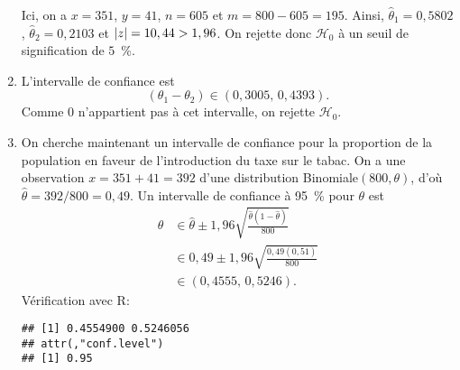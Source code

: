 \begin{solution}{6.10}
\begin{enumerate}
      Ici, on a $x = 351$, $y = 41$, $n = 605$ et $m = 800 - 605 =
      195$. Ainsi, $\hat{\theta}_1 = 0,5802$, $\hat{\theta}_2 =
      0,2103$ et $\lvert z \rvert = 10,44 > 1,96$. On rejette donc $ \mathcal{H}_0$ à un
     seuil de signification de $5$~\%. %
    \item L'intervalle de confiance est
      \begin{displaymath}
        (\theta_1 - \theta_2) \in (0,3005, \, 0,4393).
      \end{displaymath}
      Comme $0$ n'appartient pas à cet intervalle, on rejette $ \mathcal{H}_0$.
    \item On cherche maintenant un intervalle de confiance pour la
      proportion de la population en faveur de l'introduction du taxe
      sur le tabac. On a une observation $x = 351 + 41 = 392$ d'une
      distribution Binomiale$(800, \theta)$, d'où $\hat{\theta} =
      392/800 = 0,49$. Un intervalle de confiance à 95~\% pour
      $\theta$ est
      \begin{align*}
        \theta &\in \hat{\theta} \pm 1,96 \sqrt{\frac{\hat{\theta} (1 -
            \hat{\theta})}{800}} \\
        &\in 0,49 \pm 1,96 \sqrt{\frac{0,49 (0,51)}{800}} \\
        &\in (0,4555, \, 0,5246).
      \end{align*}
      Vérification avec \textsf{R}:
\begin{knitrout}
\color{fgcolor}\begin{kframe}
\begin{alltt}
\hlstd{(} \hlopt{+} \hlstd{,} \hlstd{,}  \hlstd{=} \hlstd{)}\hlopt{$}
\end{alltt}
\begin{verbatim}
## [1] 0.4554900 0.5246056
## attr(,"conf.level")
## [1] 0.95
\end{verbatim}
\end{kframe}
\end{knitrout}
    \end{enumerate}
  
\end{solution}
